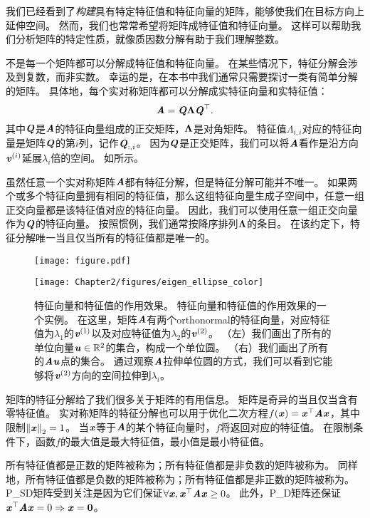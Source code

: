 我们已经看到了\emph{构建}具有特定特征值和特征向量的矩阵，能够使我们在目标方向上延伸空间。
然而，我们也常常希望将矩阵成特征值和特征向量。
这样可以帮助我们分析矩阵的特定性质，就像质因数分解有助于我们理解整数。


不是每一个矩阵都可以分解成特征值和特征向量。
在某些情况下，特征分解会涉及到复数，而非实数。
幸运的是，在本书中我们通常只需要探讨一类有简单分解的矩阵。
具体地，每个实对称矩阵都可以分解成实特征向量和实特征值：
\begin{equation}
    \MA = \MQ \VLambda \MQ^\top.
\end{equation}
其中$\MQ$是$\MA$的特征向量组成的正交矩阵，$\VLambda$是对角矩阵。
特征值$\Lambda_{i,i}$对应的特征向量是矩阵$\MQ$的第$i$列，记作$\MQ_{:,i}$。
因为$\MQ$是正交矩阵，我们可以将$\MA$看作是沿方向$\Vv^{(i)}$延展$\lambda_i$倍的空间。
如所示。


虽然任意一个实对称矩阵$\MA$都有特征分解，但是特征分解可能并不唯一。
如果两个或多个特征向量拥有相同的特征值，那么这组特征向量生成子空间中，任意一组正交向量都是该特征值对应的特征向量。
因此，我们可以使用任意一组正交向量作为$\MQ$的特征向量。
按照惯例，我们通常按降序排列$\VLambda$的条目。
在该约定下，特征分解唯一当且仅当所有的特征值都是唯一的。

\begin{figure}[!htb]
\ifOpenSource
\centerline{\texttt{[image: figure.pdf]}}
\else
\centerline{\texttt{[image: Chapter2/figures/eigen\_ellipse\_color]}}
\fi
\caption{特征向量和特征值的作用效果。
特征向量和特征值的作用效果的一个实例。
在这里，矩阵$\MA$有两个\gls{orthonormal}的特征向量，对应特征值为$\lambda_1$的$\Vv^{(1)}$以及对应特征值为$\lambda_2$的$\Vv^{(2)}$。
（左）我们画出了所有的单位向量$\Vu\in\SetR^2$的集合，构成一个单位圆。
（右）我们画出了所有的$\MA\Vu$点的集合。
通过观察$\MA$拉伸单位圆的方式，我们可以看到它能够将$\Vv^{(2)}$方向的空间拉伸到$\lambda_i$。	}
\label{fig:chap2_eigen_ellipse}
\end{figure}



矩阵的特征分解给了我们很多关于矩阵的有用信息。
矩阵是奇异的当且仅当含有零特征值。
实对称矩阵的特征分解也可以用于优化二次方程$f(\Vx) = \Vx^\top \MA \Vx$，其中限制$\norm{\Vx}_2 = 1$。
当$\Vx$等于$\MA$的某个特征向量时，$f$将返回对应的特征值。
在限制条件下，函数$f$的最大值是最大特征值，最小值是最小特征值。


所有特征值都是正数的矩阵被称为；所有特征值都是非负数的矩阵被称为。
同样地，所有特征值都是负数的矩阵被称为；所有特征值都是非正数的矩阵被称为。
\gls{P_SD}矩阵受到关注是因为它们保证$\forall \Vx, \Vx^\top \MA \Vx \geq 0$。
此外，\gls{P_D}矩阵还保证$\Vx^\top \MA \Vx =0 \Rightarrow \Vx = \mathbf{0}$。





